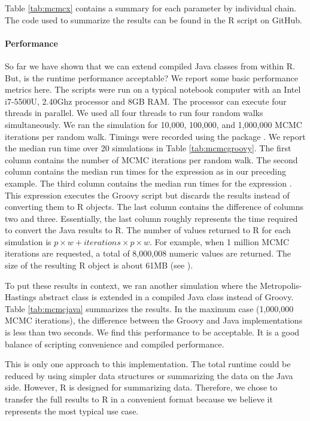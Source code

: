 Table \ref{tab:mcmcx} contains a summary for each parameter by individual chain. The code used to summarize the results can be found in the R script  on GitHub.

\paragraph{Performance} So far we have shown that we can extend compiled Java classes from within R. But, is the runtime performance acceptable? We report some basic performance metrics here. The scripts were run on a typical notebook computer with an Intel i7-5500U, 2.40Ghz processor and 8GB RAM. The processor can execute four threads in parallel. We used all four threads to run four random walks simultaneously. We ran the simulation for 10,000, 100,000, and 1,000,000 MCMC iterations per random walk. Timings were recorded using the  package \citep{microbenchmark}. We report the median run time over 20 simulations in Table \ref{tab:mcmcgroovy}. The first column contains the number of MCMC iterations per random walk. The second column contains the median run times for the expression  as in our preceding example. The third column contains the median run times for the expression . This expression executes the Groovy script but discards the results instead of converting them to R objects. The last column contains the difference of columns two and three. Essentially, the last column roughly represents the time required to convert the Java results to R. The number of values returned to R for each simulation is $p \times w + iterations \times p \times w$. For example, when 1 million MCMC iterations are requested, a total of 8,000,008 numeric values are returned. The size of the resulting R object is about 61MB (see ).

To put these results in context, we ran another simulation where the Metropolis-Hastings abstract class is extended in a compiled Java class instead of Groovy. Table \ref{tab:mcmcjava} summarizes the results. In the maximum case (1,000,000 MCMC iterations), the difference between the Groovy and Java implementations is less than two seconds. We find this performance to be acceptable. It is a good balance of scripting convenience and compiled performance.

This is only one approach to this implementation. The total runtime could be reduced by using simpler data structures or summarizing the data on the Java side. However, R is designed for summarizing data. Therefore, we chose to transfer the full results to R in a convenient format because we believe it represents the most typical use case.

